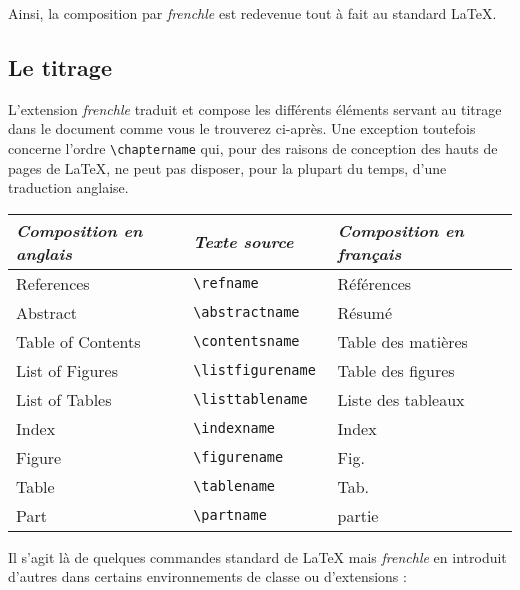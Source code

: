 \documentclass[a4paper,12pt,openright]{article}
\begin{document}
Ainsi, la composition par \textit{frenchle} est redevenue tout à fait au standard
\LaTeX.
\subsection{ Le titrage}
L’extension \textit{frenchle} traduit et compose les différents éléments servant au
titrage dans le document comme vous le trouverez ci-après. Une exception
toutefois concerne l’ordre \verb|\chaptername| qui, pour des raisons de conception
des hauts de pages de \LaTeX, ne peut pas disposer, pour la plupart du temps,
d’une traduction anglaise.\\[1em]

\begin{tabular}{|l|l|l|}\hline
\rule{0pt}{1.1em}\textit{Composition en anglais}&\textit{Texte source}&\textit{Composition en français}\\\hline
\rule{0pt}{1em}References         &\tt{\backslash}refname        &Références \index{refname@\verb'\refname '}         \\
Abstract           &\tt{\backslash}abstractname   &Résumé    \index{abstractname@\verb'\abstractname '}         \\
Table of Contents  &\tt{\backslash}contentsname   &Table des matières \index{contentsname@\verb'\contentsname'}\\
List of Figures    &\tt{\backslash}listfigurename &Table des figures  \index{listfigurename@\verb'\listfigurename'}\\
List of Tables     &\tt{\backslash}listtablename  &Liste des tableaux\index{listtablename@\verb'\listtablename'} \\
Index              &\tt{\backslash}indexname      &Index            \index{indexname@\verb'\indexname'}  \\
Figure             &\tt{\backslash}figurename     &Fig.            \index{figurename@\verb'\figurename'}   \\
Table              &\tt{\backslash}tablename      &Tab.          \index{tablename@\verb'\tablename'}     \\
Part               &\tt{\backslash}partname       &partie        \index{partname@\verb'\partname'}     \\
\hline
\end{tabular}

\bigskip
Il s’agit là de quelques commandes standard de \LaTeX{} mais \textit{frenchle} en
introduit d’autres dans certains environnements de classe ou d’extensions :
\end{document}
